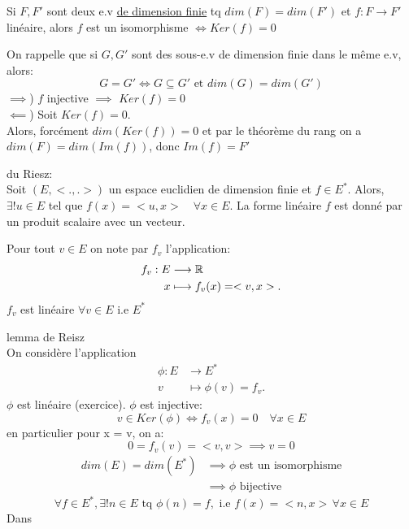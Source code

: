 \documentclass[a4paper]{report}
\begin{document}
\begin{prop}
    Si $F, F'$ sont deux e.v \underline{de dimension finie} tq $dim(F) = dim(F')$ et  $f: F \to F'$ linéaire, alors $f$ est un isomorphisme $\iff Ker(f) = {0}$
\end{prop}
\begin{explanation}
   On rappelle que si $G, G'$ sont des sous-e.v de dimension finie dans le même e.v, alors:
   \[
   G = G' \iff G \subseteq G' \text{ et } dim(G) = dim(G')
   \] 
   $\implies$) $f$ injective  $\implies$ $Ker(f) = {0}$\\
   $\impliedby$) Soit $Ker(f) = {0}$.\\
   Alors, forcément  $dim(Ker(f)) = 0$ et par le théorème du rang on a  $dim(F) = dim(Im(f))$, donc  $Im(f) = F'$
\end{explanation}
\begin{lemma} du Riesz:\\
    Soit $(E, <.,.>)$ un espace euclidien de  dimension finie et $f \in E^*$. Alors, $\exists! u \in E$ tel que $f(x) = <u, x> \quad \forall x \in E$. La forme linéaire $f$ est donné par un produit scalaire avec un vecteur. 
\end{lemma}
\begin{notation}
   Pour tout $v \in E$ on note par  $f_v$ l'application:
   \begin{align*}
       f_v: E &\longrightarrow \mathbb{R} \\
       x &\longmapsto f_v(x) = <v, x>
   .\end{align*}
   $f_v$ est linéaire  $\forall v \in E$ i.e $E^*$
\end{notation}
\begin{explanation} lemma de Reisz\\
   On considère l'application
   \begin{align*}
       \phi: E &\longrightarrow E^* \\
       v &\longmapsto \phi(v) = f_v
   .\end{align*}
   $\phi$ est linéaire (exercice).  $\phi$ est injective:
   \[
   v \in Ker(\phi) \iff f_v(x) = 0 \quad \forall x \in E
   \] 
   en particulier pour x = v, on a:
   \[
   0 = f_v(v) = <v,v> \implies v = 0
   \] 
   \begin{align*}
       dim(E) = dim(E^*) &\implies \phi \text{ est un isomorphisme}\\
                         &\implies \phi \text{ bijective}
   \end{align*}
   \[
   \forall f \in E^*, \exists! n \in E \text{ tq } \phi(n) = f, \text{ i.e } f(x) = <n, x> \, \forall x \in E
   \] 
   Dans
\end{explanation}
\end{document}
